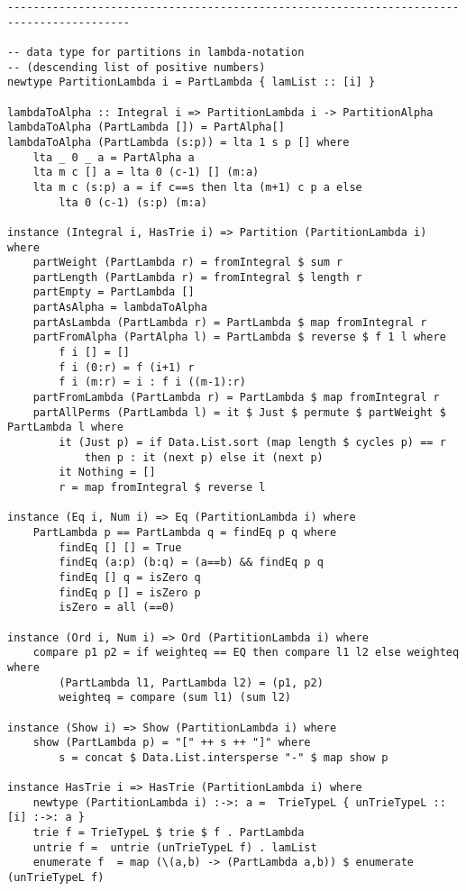 \begin{lstlisting}
-----------------------------------------------------------------------------------------

-- data type for partitions in lambda-notation
-- (descending list of positive numbers)
newtype PartitionLambda i = PartLambda { lamList :: [i] }

lambdaToAlpha :: Integral i => PartitionLambda i -> PartitionAlpha
lambdaToAlpha (PartLambda []) = PartAlpha[] 
lambdaToAlpha (PartLambda (s:p)) = lta 1 s p [] where
	lta _ 0 _ a = PartAlpha a
	lta m c [] a = lta 0 (c-1) [] (m:a)
	lta m c (s:p) a = if c==s then lta (m+1) c p a else 
		lta 0 (c-1) (s:p) (m:a)

instance (Integral i, HasTrie i) => Partition (PartitionLambda i) where
	partWeight (PartLambda r) = fromIntegral $ sum r
	partLength (PartLambda r) = fromIntegral $ length r
	partEmpty = PartLambda []
	partAsAlpha = lambdaToAlpha
	partAsLambda (PartLambda r) = PartLambda $ map fromIntegral r
	partFromAlpha (PartAlpha l) = PartLambda $ reverse $ f 1 l where
		f i [] = []
		f i (0:r) = f (i+1) r
		f i (m:r) = i : f i ((m-1):r)
	partFromLambda (PartLambda r) = PartLambda $ map fromIntegral r
	partAllPerms (PartLambda l) = it $ Just $ permute $ partWeight $ PartLambda l where
		it (Just p) = if Data.List.sort (map length $ cycles p) == r 
			then p : it (next p) else it (next p)
		it Nothing = []
		r = map fromIntegral $ reverse l

instance (Eq i, Num i) => Eq (PartitionLambda i) where
	PartLambda p == PartLambda q = findEq p q where
		findEq [] [] = True
		findEq (a:p) (b:q) = (a==b) && findEq p q
		findEq [] q = isZero q
		findEq p [] = isZero p 
		isZero = all (==0) 

instance (Ord i, Num i) => Ord (PartitionLambda i) where
	compare p1 p2 = if weighteq == EQ then compare l1 l2 else weighteq where
		(PartLambda l1, PartLambda l2) = (p1, p2)
		weighteq = compare (sum l1) (sum l2)

instance (Show i) => Show (PartitionLambda i) where
	show (PartLambda p) = "[" ++ s ++ "]" where
		s = concat $ Data.List.intersperse "-" $ map show p

instance HasTrie i => HasTrie (PartitionLambda i) where
	newtype (PartitionLambda i) :->: a =  TrieTypeL { unTrieTypeL :: [i] :->: a }
	trie f = TrieTypeL $ trie $ f . PartLambda
	untrie f =  untrie (unTrieTypeL f) . lamList
	enumerate f  = map (\(a,b) -> (PartLambda a,b)) $ enumerate (unTrieTypeL f)
\end{lstlisting}